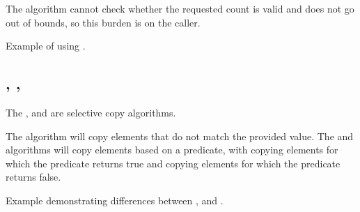 The algorithm cannot check whether the requested count is valid and does not go out of bounds, so this burden is on the caller.

\begin{codebox}[]{\href{https://compiler-explorer.com/z/KGYab3WEr}{\ExternalLink}}
\footnotesize Example of using .
\tcblower
{}
\end{codebox}

\subsection{\texorpdfstring{, , }{\texttt{std::copy\_if}, \texttt{std::remove\_copy}, \texttt{std::remove\_copy\_if}}}

The ,  and  are selective copy algorithms.



The  algorithm will copy elements that do not match the provided value. The  and  algorithms will copy elements based on a predicate, with  copying elements for which the predicate returns true and  copying elements for which the predicate returns false.

\begin{codebox}[breakable]{\href{https://compiler-explorer.com/z/vY6bTcqsr}{\ExternalLink}}
\footnotesize Example demonstrating differences between ,  and .
\tcblower
{}
\end{codebox}

\subsection{\texorpdfstring{}{\texttt{std::sample}}}

